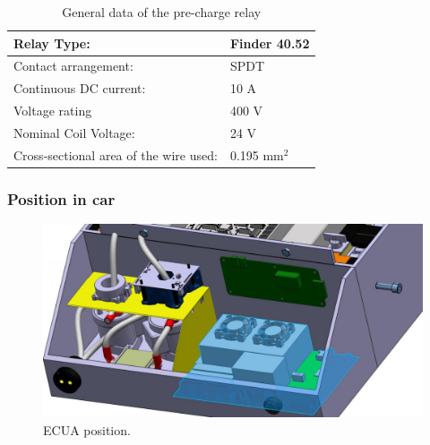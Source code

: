 \begin{table}[H]
	\centering
	\caption{General data of the pre-charge relay}
	\begin{tabularx}{\textwidth}{|X|X|}
		\hline
		Relay Type: & Finder 40.52\\[\TableSize]
		\hline
		Contact arrangement: &  SPDT \\[\TableSize]
		\hline
		Continuous DC current:  & 10 A\\[\TableSize]
		\hline
		Voltage rating  & 400 V\\[\TableSize]
		\hline
		Nominal Coil Voltage: & 24 V \\[\TableSize]
		\hline
		Cross-sectional area of the wire used: & 0.195 mm$^2$ \\[\TableSize]
		\hline
	\end{tabularx}%
	\label{tab:precharge-relay}%
\end{table}%

\subsubsection{Position in car}

\begin{figure}[H]
	\centering
	\includegraphics[width=\textwidth]{./img/ECUA_POSITION.jpg}
	\caption{ECUA position.}
	\label{fig:ECUA}
\end{figure}